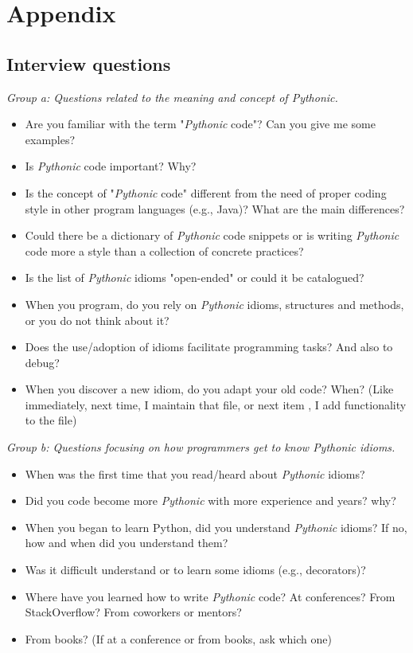 \documentclass[a4paper]{article}
\begin{document}
\section{Appendix}
\begin{appendices}
 	\section{Interview questions}
 	\label{appendix:interviewsquestions}
\textit{Group a: Questions related to the meaning and concept of \textit{Pythonic}.}
\begin{itemize}
   \item Are you familiar with the term "\textit{Pythonic} code"? Can you give me some examples?
  
  \item Is \textit{Pythonic} code important? Why?
  
  \item Is the concept of "\textit{Pythonic} code" different from the need of proper coding style in other program languages (e.g., Java)? What are the main differences?
  \item Could there be a dictionary of \textit{Pythonic} code snippets or is writing \textit{Pythonic} code more a style than a collection of concrete practices?
  \item Is the list of \textit{Pythonic} idioms "open-ended" or could it be catalogued?
  \item When you program, do you rely on \textit{Pythonic} idioms, structures and methods, or you do not think about it?
  \item Does the use/adoption of idioms facilitate programming tasks? And also to debug?
  \item When you discover a new idiom, do you adapt your old code? When? (Like immediately, next time, I maintain that file, or next item , I add functionality to the file)
\end{itemize}

\textit{Group b: Questions focusing on how programmers get to know \textit{Pythonic} idioms.}
\begin{itemize}
  \item When was the first time that you read/heard about \textit{Pythonic} idioms?
  \item Did you code become more \textit{Pythonic} with more experience and years? why?
  \item When you began to learn Python, did you understand \textit{Pythonic} idioms? If no, how and when did you understand them?
  \item Was it difficult understand or to learn some idioms (e.g., decorators)?
  \item Where have you learned how to write \textit{Pythonic} code? At conferences? From StackOverflow? From coworkers or mentors? \item From books? (If at a conference or from books, ask which one)
\end{itemize}


\end{appendices}
\end{document}
